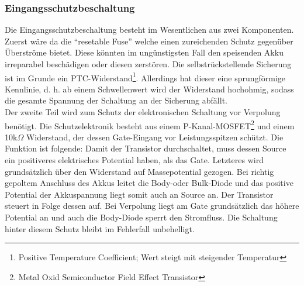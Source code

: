 \documentclass[12pt]{scrreprt} %
\begin{document}
\subsubsection{Eingangsschutzbeschaltung}
Die Eingangsschutzbeschaltung besteht im Wesentlichen aus zwei Komponenten. Zuerst wäre da die "`resetable Fuse"' welche einen zureichenden Schutz gegenüber Überströme bietet. Diese könnten im ungünstigsten Fall den speisenden Akku irreparabel beschädigen oder diesen zerstören. Die selbstrückstellende Sicherung ist im Grunde ein PTC-Widerstand\footnote{Positive Temperature Coefficient; Wert steigt mit steigender Temperatur}. Allerdings hat dieser eine sprungförmige Kennlinie, d. h. ab einem Schwellenwert wird der Widerstand hochohmig, sodass die gesamte Spannung der Schaltung an der Sicherung abfällt.\\
Der zweite Teil wird zum Schutz der elektronischen Schaltung vor Verpolung benötigt. Die Schutzelektronik besteht aus einem P-Kanal-MOSFET\footnote{Metal Oxid Semiconductor Field Effect Transistor} und einem 10k$\Omega$ Widerstand, der dessen Gate-Eingang vor Leistungsspitzen schützt. Die Funktion ist folgende: Damit der Transistor durchschaltet, muss dessen Source ein positiveres elektrisches Potential haben, als das Gate. Letzteres wird grundsätzlich über den Widerstand auf Massepotential gezogen. Bei richtig gepoltem Anschluss des Akkus leitet die Body-oder Bulk-Diode und das positive Potential der Akkuspannung liegt somit auch an Source an. Der Transistor steuert in Folge dessen auf. Bei Verpolung liegt am Gate grundsätzlich das höhere Potential an und auch die Body-Diode sperrt den Stromfluss. Die Schaltung hinter diesem Schutz bleibt im Fehlerfall unbehelligt. 
\end{document}
